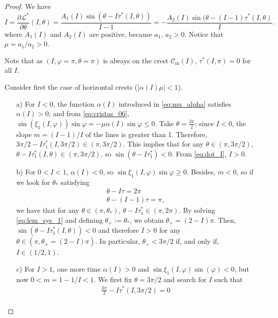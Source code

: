 \documentclass[a4paper,10pt]{article}
\newcommand{\m}{\text{m}}
\newcommand{\NH}{\text{NHIM}}
\newcommand{\zerom}{\text{1}}
\theoremstyle{definition}
\begin{document}
\begin{proof}
We have
\begin{equation}
\dot{I} =\frac{\partial \mathcal{L}^*}{\partial\theta}(I,\theta) = \frac{A_1(I)\sin(\theta - I\tau^*(I,\theta))}{I-1}  = -\frac{A_2(I)\sin(\theta - (I-1)\tau^*(I,\theta)}{I}.\label{eq:dot_I}
\end{equation}
where $A_{1}(I)$ and $A_{2}(I)$ are positive, because $a_1,\,a_{2}>0$.
Notice that $\mu = a_1/a_2 >0$.

Note that as $(I , \varphi = \pi,\theta = \pi)$ is always on the crest $\mathcal{C}_{\m}(I)$, $\tau^*(I,\pi)= 0 $ for all $I$.

Consider first the case of horizontal crests ($\left|\alpha(I)\mu\right|< 1$).
\begin{itemize}
\item[a)] For $I< 0$, the function $\alpha(I)$ introduced in \eqref{eq:mu_alpha} satisfies $\alpha(I)> 0 $, and from \eqref{eq:cristas_06}, $\sin(\xi_{\zerom}(I,\varphi))\sin\varphi = -\mu \alpha(I)\sin\varphi\leq 0$.
Take $\theta = \frac{3\pi}{2}$; since $I<0$, the slope $m = (I-1)/I$ of the {\NH} lines is greater than 1.
Therefore, $3\pi/2 - I\tau_{\zerom}^*(I,3\pi/2)\in(\pi,3\pi/2)$.
This implies that for any $\theta \in (\pi, 3\pi/2)$, $\theta - I\tau_{\zerom}^*(I,\theta) \in (\pi,3\pi/2)$, so $\sin(\theta - I\tau_{\zerom}^*)<0$.
From \eqref{eq:dot_I}, $\dot{I}>0$.
\item[b)] For $0<I<1$, $\alpha(I)< 0$, so $\sin\xi_{\zerom}(I,\varphi)\sin\varphi\geq 0$.
Besides, $m<0$, so if we look for $\theta_*$ satisfying
\begin{eqnarray}
\theta - I\tau = 2\pi\label{eq:lem_sys_1}\\
\theta - (I-1)\tau = \pi,\nonumber
\end{eqnarray}
we have that for any $\theta\in(\pi,\theta_*)$, $\theta - I\tau^*_{\zerom}\in(\pi,2\pi)$.
By solving \eqref{eq:lem_sys_1} and defining $\theta_+ := \theta_*$, we obtain $\theta_+ = (2-I)\pi$.
Then, $\sin(\theta - I\tau^*_{\zerom}(I,\theta))<0$ and therefore $\dot{I}>0$ for any $\theta \in (\pi,\theta_+ = (2-I)\pi)$.
In particular, $\theta_+ <3\pi/2$ if, and only if, $I\in(1/2,1)$.
\item[c)] For $I >1$, one more time $\alpha(I) > 0$ and $\sin\xi_{\zerom}(I,\varphi)\sin(\varphi)< 0$, but now $ 0 < m = 1 - 1/I < 1 $.
We first fix $ \theta = 3 \pi/ 2 $ and search for $I$ such that
\begin{eqnarray*}
\frac{3\pi}{2} -I\tau^*(I,3\pi/2) = 0\\

\end{eqnarray*}
\end{itemize}
\end{proof}
\end{document}
